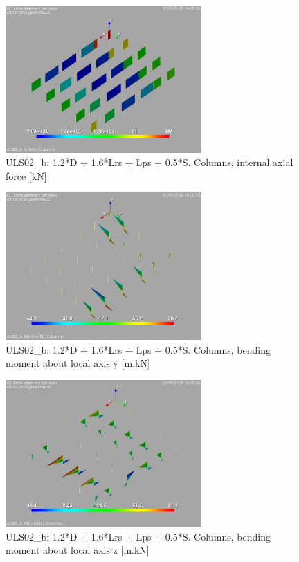 \begin{figure}
\begin{center}
\includegraphics[width=75mm]{annex_res_columns/graphics/resSimplLC/ULS02_bcolumnsN}
\caption{ULS02\_b: 1.2*D + 1.6*Lrs + Lps + 0.5*S. Columns, internal axial force [kN]}
\end{center}
\end{figure}
\begin{figure}
\begin{center}
\includegraphics[width=75mm]{annex_res_columns/graphics/resSimplLC/ULS02_bcolumnsMy}
\caption{ULS02\_b: 1.2*D + 1.6*Lrs + Lps + 0.5*S. Columns, bending moment about local axis y [m.kN]}
\end{center}
\end{figure}
\begin{figure}
\begin{center}
\includegraphics[width=75mm]{annex_res_columns/graphics/resSimplLC/ULS02_bcolumnsMz}
\caption{ULS02\_b: 1.2*D + 1.6*Lrs + Lps + 0.5*S. Columns, bending moment about local axis z [m.kN]}
\end{center}
\end{figure}
